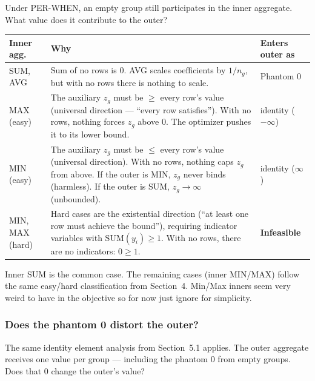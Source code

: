 \documentclass[11pt]{article}
\begin{document}
Under PER-WHEN, an empty group still participates in the inner aggregate.
What value does it contribute to the outer?

\begin{center}
\begin{tabular}{>{\raggedright\arraybackslash}p{}
                >{\raggedright\arraybackslash}p{}
                >{\raggedright\arraybackslash}p{}}
\toprule
\textbf{Inner agg.} & \textbf{Why} & \textbf{Enters outer as} \\
\midrule
SUM, AVG &
    Sum of no rows is 0. AVG scales
    coefficients by $1/n_g$, but with no rows there is nothing
    to scale. &
    Phantom 0 \\[6pt]
MAX (easy) &
    The auxiliary $z_g$ must be $\geq$ every row's value (universal
    direction --- ``every row satisfies''). With no rows, nothing
    forces $z_g$ above 0. The optimizer pushes it to its lower
    bound. &
    identity ($-\infty$) \\[6pt]
MIN (easy) &
    The auxiliary $z_g$ must be $\leq$ every row's value (universal
    direction). With no rows, nothing caps $z_g$ from above. If the
    outer is MIN, $z_g$ never binds (harmless). If the outer is SUM,
    $z_g \to \infty$ (unbounded). &
    identity ($\infty$) \\[6pt]
MIN, MAX (hard) &
    Hard cases are the existential direction (``at least one row must
    achieve the bound''), requiring indicator variables with
    $\text{SUM}(y_i) \geq 1$. With no rows, there are no indicators:
    $0 \geq 1$. &
    \textbf{Infeasible} \\
\bottomrule
\end{tabular}
\end{center}

Inner SUM is the common case. The remaining cases (inner MIN/MAX) follow
the same easy/hard classification from Section~4. Min/Max inners seem very weird to have in the objective so for now just ignore for simplicity.

\subsubsection*{Does the phantom 0 distort the outer?}

The same identity element analysis from Section~5.1 applies. The outer
aggregate receives one value per group --- including the phantom 0 from
empty groups. Does that 0 change the outer's value?
\end{document}
